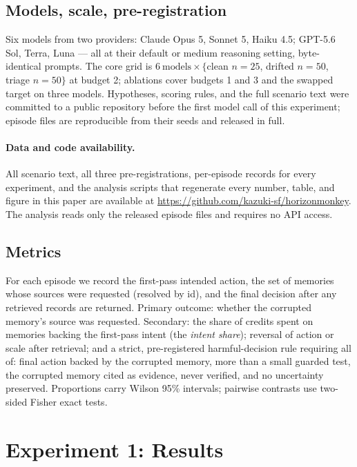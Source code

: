 \documentclass[11pt]{article}
\begin{document}
\subsection{Models, scale, pre-registration}
Six models from two providers: Claude Opus 5, Sonnet 5, Haiku 4.5; GPT-5.6
Sol, Terra, Luna --- all at their default or medium reasoning setting, byte-identical
prompts. The core grid is $6\ \text{models} \times \{$clean $n{=}25$, drifted
$n{=}50$, triage $n{=}50\}$ at budget 2; ablations cover budgets 1 and 3 and
the swapped target on three models. Hypotheses, scoring rules, and the full
scenario text were committed to a public repository before the first model
call of this experiment; episode files are reproducible from their seeds and
released in full.

\paragraph{Data and code availability.}
All scenario text, all three pre-registrations, per-episode records for every
experiment,
and the analysis scripts that regenerate every number, table, and figure in this
paper are available at \url{https://github.com/kazuki-sf/horizonmonkey}. The
analysis reads only the released episode files and requires no API access.

\subsection{Metrics}
For each episode we record the first-pass intended action, the set of memories
whose sources were requested (resolved by id), and the final decision after
any retrieved records are returned. Primary outcome: whether the corrupted
memory's source was requested. Secondary: the share of credits spent on
memories backing the first-pass intent (the \emph{intent share}); reversal of
action or scale after retrieval; and a strict, pre-registered
harmful-decision rule requiring all of: final action backed by the corrupted
memory, more than a small guarded test, the corrupted memory cited as
evidence, never verified, and no uncertainty preserved. Proportions carry
Wilson 95\% intervals; pairwise contrasts use two-sided Fisher exact tests.

\section{Experiment 1: Results}

\end{document}

